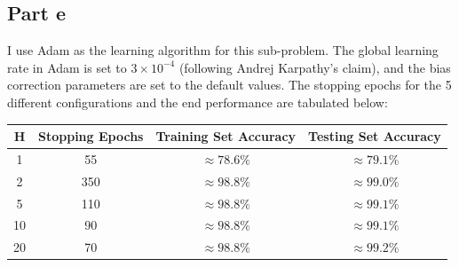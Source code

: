 \documentclass{article}
\begin{document}
\subsection*{Part e}
\begin{flushleft}
I use Adam as the learning algorithm for this sub-problem. The global learning rate in Adam is set to \(3 \times 10^{-4}\) (following Andrej Karpathy's claim), and the bias correction parameters are set to the default values. The stopping epochs for the 5 different configurations and the end performance are tabulated below:
\begin{center}
\begin{tabular}{|c|c|c|c|}
\hline
H & Stopping Epochs & Training Set Accuracy & Testing Set Accuracy \\
\hline
\hline
1 & 55 & \(\approx 78.6\%\) & \(\approx 79.1\%\)\\
\hline
2 & 350 & \(\approx 98.8\%\)& \(\approx 99.0\%\)\\
\hline
5 & 110 & \(\approx 98.8\%\)& \(\approx 99.1\%\)\\
\hline
10 & 90 & \(\approx 98.8\%\)& \(\approx 99.1\%\)\\
\hline
20 & 70 & \(\approx 98.8\%\)& \(\approx 99.2\%\)\\
\hline
\end{tabular}
\end{center}


\end{flushleft}
\end{document}
